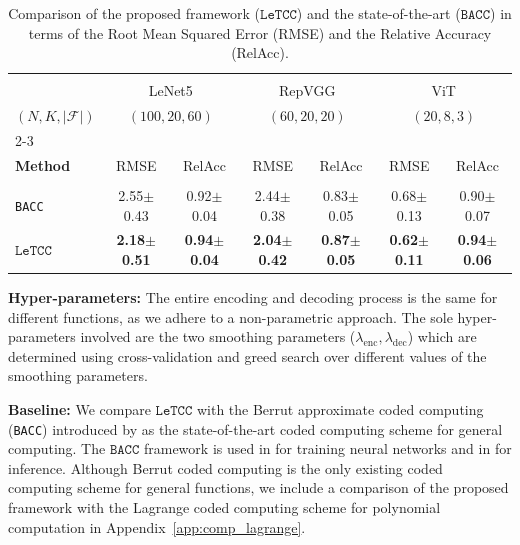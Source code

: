 \documentclass{article}
\def\nprcc{\texttt{LeTCC}}
\def\stset{\mathcal{F}}
\begin{document}
\begin{table}[t]
\caption{Comparison of the proposed framework ($\nprcc$) and the state-of-the-art ($\texttt{BACC}$) in terms of the Root Mean Squared Error (RMSE) and the Relative Accuracy (RelAcc).}
\label{table:perf_mse_racc}
\begin{center}
\begin{small}
\begin{sc}
\begin{tabular}{lcc|cc|cc}
    \hline  & \\[-1.5ex]
    ~ %
    & \multicolumn{2}{c}{LeNet5} & \multicolumn{2}{c}{RepVGG}  & \multicolumn{2}{c}{ViT} \\
    $(N, K, |\stset|)$
    &  \multicolumn{2}{c}{$(100, 20, 60)$}  & \multicolumn{2}{c}{$(60, 20, 20)$}  & \multicolumn{2}{c}{$(20, 8, 3)$} \\
    \cline{2-3}
    \cline{4-5}
    \cline{6-7}
     & \\[-1.5ex]
     \bf{Method} & \multicolumn{1}{c}{RMSE} & \multicolumn{1}{c}{RelAcc} & \multicolumn{1}{c}{RMSE} & \multicolumn{1}{c}{RelAcc} & \multicolumn{1}{c}{RMSE} & \multicolumn{1}{c}{RelAcc} \\
    \hline  & \\[-1.5ex]
    \texttt{BACC}  & 2.55$\pm$ 0.43   & 0.92$\pm$ 0.04  & 2.44$\pm$ 0.38 & 0.83$\pm$ 0.05 & 0.68$\pm$ 0.13 & 0.90$\pm$ 0.07  \\
    $\nprcc$    & \textbf{2.18$\pm$ 0.51}  &\textbf{0.94$\pm$ 0.04} & \textbf{2.04$\pm$ 0.42}& \textbf{0.87$\pm$ 0.05} & \textbf{0.62$\pm$ 0.11} & \textbf{0.94$\pm$ 0.06} \\
    \bottomrule
\end{tabular}
\end{sc}
\end{small}
\end{center}
\end{table}

\textbf{Hyper-parameters:} The entire encoding and decoding process is the same for different functions, as we adhere to a non-parametric approach. The sole hyper-parameters involved are the two smoothing parameters ($\lambda_{\textrm{enc}}, \lambda_{\textrm{dec}}$) which are determined using cross-validation and greed search over different values of the smoothing parameters.

\textbf{Baseline:} We compare $\nprcc$ with the Berrut approximate coded computing (\texttt{BACC}) introduced by \citep{jahani2022berrut} as the state-of-the-art coded computing scheme for general computing. The $\texttt{BACC}$ framework is used in \citep{jahani2022berrut} for training neural networks and in \citep{soleymani2022approxifer} for inference. Although Berrut coded computing \citep{jahani2022berrut} is the only existing coded computing scheme for general functions, we include a comparison of the proposed framework with the Lagrange coded computing scheme \citep{yu2019lagrange} for polynomial computation in Appendix~\ref{app:comp_lagrange}.
\end{document}
